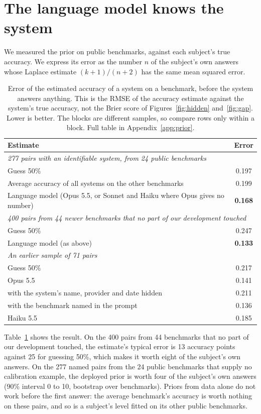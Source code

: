 \documentclass{article}
\begin{document}
\section{The language model knows the system}
\label{sec:prior}

We measured the prior on public benchmarks, against each subject's true accuracy. We express its error as the number $n$ of the subject's own answers whose Laplace estimate $(k+1)/(n+2)$ has the same mean squared error.

\begin{table}[t]
\centering
\caption{Error of the estimated accuracy of a system on a benchmark, before the system answers anything. This is the RMSE of the accuracy estimate against the system's true accuracy, not the Brier score of Figures~\ref{fig:hidden} and~\ref{fig:gap}. Lower is better. The blocks are different samples, so compare rows only within a block. Full table in Appendix~\ref{app:prior}.}
\label{tab:prior}
\small
\begin{tabular}{lc}
\toprule
Estimate & Error \\
\midrule
\multicolumn{2}{l}{\emph{277 pairs with an identifiable system, from 24 public benchmarks}} \\
Guess 50\% & 0.197 \\
Average accuracy of all systems on the other benchmarks & 0.199 \\
Language model (Opus 5.5, or Sonnet and Haiku where Opus gives no number) & \textbf{0.168} \\
\midrule
\midrule
\multicolumn{2}{l}{\emph{400 pairs from 44 newer benchmarks that no part of our development touched}} \\
Guess 50\% & 0.247 \\
Language model (as above) & \textbf{0.133} \\
\midrule
\multicolumn{2}{l}{\emph{An earlier sample of 71 pairs}} \\
Guess 50\% & 0.217 \\
Opus 5.5 & 0.141 \\
\quad with the system's name, provider and date hidden & 0.211 \\
\quad with the benchmark named in the prompt & 0.136 \\
Haiku 5.5 & 0.185 \\
\bottomrule
\end{tabular}
\end{table}

Table~\ref{tab:prior} shows the result. On the 400 pairs from 44 benchmarks that no part of our development touched, the estimate's typical error is 13 accuracy points against 25 for guessing 50\%, which makes it worth eight of the subject's own answers. On the 277 named pairs from the 24 public benchmarks that supply no calibration example, the deployed prior is worth four of the subject's own answers (90\% interval 0 to 10, bootstrap over benchmarks). Priors from data alone do not work before the first answer: the average benchmark's accuracy is worth nothing on these pairs, and so is a subject's level fitted on its other public benchmarks.
\end{document}

